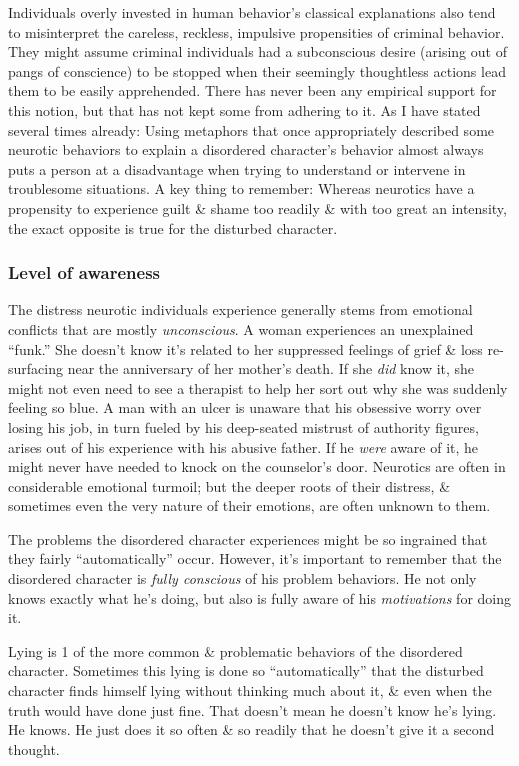 \documentclass{article}
\numberwithin{equation}{section}
\begin{document}
Individuals overly invested in human behavior's classical explanations also tend to misinterpret the careless, reckless, impulsive propensities of criminal behavior. They might assume criminal individuals had a subconscious desire (arising out of pangs of conscience) to be stopped when their seemingly thoughtless actions lead them to be easily apprehended. There has never been any empirical support for this notion, but that has not kept some from adhering to it. As I have stated several times already: Using metaphors that once appropriately described some neurotic behaviors to explain a disordered character's behavior almost always puts a person at a disadvantage when trying to understand or intervene in troublesome situations. A key thing to remember: Whereas neurotics have a propensity to experience guilt \& shame too readily \& with too great an intensity, the exact opposite is true for the disturbed character.

\subsubsection{Level of awareness}
The distress neurotic individuals experience generally stems from emotional conflicts  that are mostly \textit{unconscious}. A woman experiences an unexplained ``funk.'' She doesn't know it's related to her suppressed feelings of grief \& loss re-surfacing near the anniversary of her mother's death. If she \textit{did} know it, she might not even need to see a therapist to help her sort out why she was suddenly feeling so blue. A man with an ulcer is unaware that his obsessive worry over losing his job, in turn fueled by his deep-seated mistrust of authority figures, arises out of his experience with his abusive father. If he \textit{were} aware of it, he might never have needed to knock on the counselor's door. Neurotics are often in considerable emotional turmoil; but the deeper roots of their distress, \& sometimes even the very nature of their emotions, are often unknown to them.
	
The problems the disordered character experiences might be so ingrained that they fairly ``automatically'' occur. However, it's important to remember that the disordered character is \textit{fully conscious} of his problem behaviors. He not only knows exactly what he's doing, but also is fully aware of his \textit{motivations} for doing it.

Lying is 1 of the more common \& problematic behaviors of the disordered character. Sometimes this lying is done so ``automatically'' that the disturbed character finds himself lying without thinking much about it, \& even when the truth would have done just fine. That doesn't mean he doesn't know he's lying. He knows. He just does it so often \& so readily that he doesn't give it a second thought.
\end{document}
